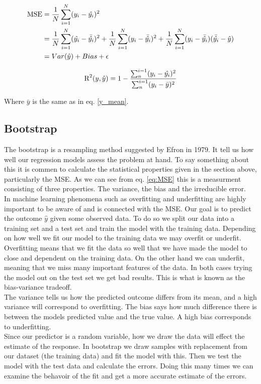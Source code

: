 \documentclass[a4paper,12pt, english]{article}
\begin{document}
\begin{align} \label{eq:MSE}
\textnormal{MSE} &= \frac{1}{N} \sum_{i=1}^N (y_i - \hat{y_i})^2 \\
&= \frac{1}{N} \sum_{i=1}^N (\hat{y_i} - \bar{\hat{y_i}})^2 + \frac{1}{N} \sum_{i=1}^N (y_i - \bar{\hat{y_i}})^2 + \frac{1}{N} \sum_{i=1}^N (y_i - \bar{\hat{y_i}})(\bar{\hat{y_i}} - \hat{y}) \\
&= Var(\hat{y}) + Bias + \epsilon
\end{align}

\begin{equation}
\textnormal{R}^2(y,\hat{y}) = 1 - \frac{\sum_{n}^{i=1} (y_i - \hat{y_i})^2}{\sum_{n}^{i=1}(y_i - \bar{y})^2}
\end{equation}

Where $\bar{y}$ is the same as in eq. \ref{y_mean}.


\subsection*{Bootstrap}

The bootstrap is a resampling method suggested by Efron in 1979. It tell us how well our regression models assess the problem at hand. To say something about this it is commen to calculate the statistical properties given in the section above, particularly the MSE. As we can see from eq. \ref{eq:MSE} this is a measurment consisting of three properties. The variance, the bias and the irreducible error.	\\
In machine learning phenomena such as overfitting and underfitting are highly important to be aware of and is connected with the MSE. Our goal is to predict the outcome $\hat{y}$ given some observed data. To do so we split our data into a training set and a test set and train the model with the training data. Depending on how well we fit our model to the training data we may overfit or underfit. Overfitting means that we fit the data so well that we have made the model to close and dependent on the training data. 
On the other hand we can underfit, meaning that we miss many important features of the data. In both cases trying the model out on the test set we get bad results. This is what is known as the bias-variance tradeoff. \\
The variance tells us how the predicted outcome differs from its mean, and a high variance will correspond to overfitting. The bias says how much difference there is between the models predicted value and the true value. A high bias corresponds to underfitting. \\
Since our predictor is a random variable, how we draw the data will effect the estimate of the response. In bootstrap we draw samples with replacement from our dataset (the training data) and fit the model with this. Then we test the model with the test data and calculate the errors. Doing this many times we can examine the behavoir of the fit and get a more accurate estimate of the errors. 
\end{document}
